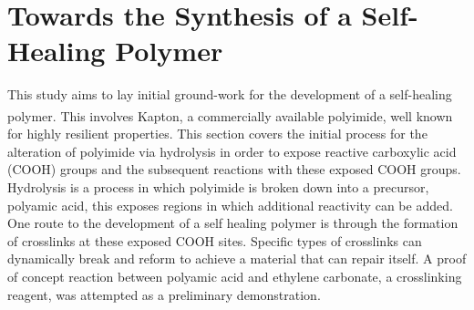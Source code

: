 \chapter{Towards the Synthesis of a Self-Healing Polymer} %
\label{cha:chem} %

This study aims to lay initial ground-work for the development of a self-healing polymer. This involves Kapton\textsuperscript{\textregistered}, a commercially available polyimide, well known for highly resilient properties. This section covers the initial process for the alteration of polyimide via hydrolysis in order to expose reactive carboxylic acid (COOH) groups and the subsequent reactions with these exposed COOH groups. Hydrolysis is a process in which polyimide is broken down into a precursor, polyamic acid, this exposes regions in which additional reactivity can be added. One route to the development of a self healing polymer is through the formation of crosslinks at these exposed COOH sites. Specific types of crosslinks can dynamically break and reform to achieve a material that can repair itself. A proof of concept reaction between polyamic acid and ethylene carbonate, a crosslinking reagent, was attempted as a preliminary demonstration.








